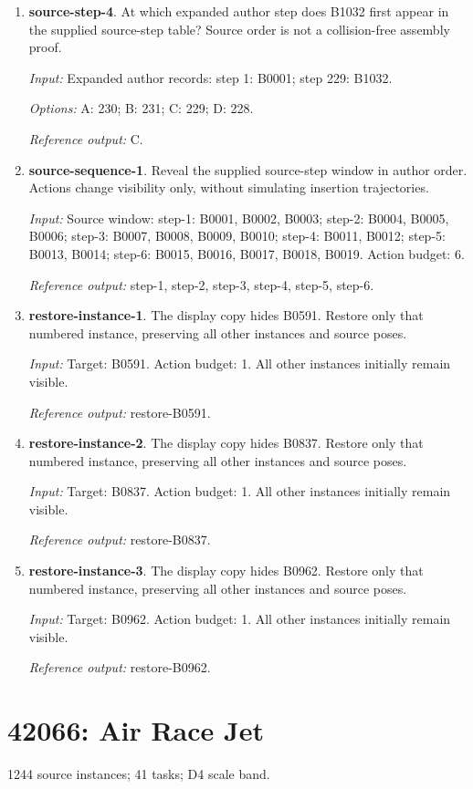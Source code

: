 \begin{enumerate}
\item \textbf{source-step-4}. At which expanded author step does B1032 first appear in the supplied source-step table? Source order is not a collision-free assembly proof.\par {\small \textit{Input:} Expanded author records: step 1: B0001; step 229: B1032. \par\textit{Options:} A: 230; B: 231; C: 229; D: 228. \par\textit{Reference output:} C.}
\item \textbf{source-sequence-1}. Reveal the supplied source-step window in author order. Actions change visibility only, without simulating insertion trajectories.\par {\small \textit{Input:} Source window: step-1: B0001, B0002, B0003; step-2: B0004, B0005, B0006; step-3: B0007, B0008, B0009, B0010; step-4: B0011, B0012; step-5: B0013, B0014; step-6: B0015, B0016, B0017, B0018, B0019. Action budget: 6. \par\textit{Reference output:} step-1, step-2, step-3, step-4, step-5, step-6.}
\item \textbf{restore-instance-1}. The display copy hides B0591. Restore only that numbered instance, preserving all other instances and source poses.\par {\small \textit{Input:} Target: B0591. Action budget: 1. All other instances initially remain visible. \par\textit{Reference output:} restore-B0591.}
\item \textbf{restore-instance-2}. The display copy hides B0837. Restore only that numbered instance, preserving all other instances and source poses.\par {\small \textit{Input:} Target: B0837. Action budget: 1. All other instances initially remain visible. \par\textit{Reference output:} restore-B0837.}
\item \textbf{restore-instance-3}. The display copy hides B0962. Restore only that numbered instance, preserving all other instances and source poses.\par {\small \textit{Input:} Target: B0962. Action budget: 1. All other instances initially remain visible. \par\textit{Reference output:} restore-B0962.}
\end{enumerate}
\clearpage
\section{42066: Air Race Jet}
1244 source instances; 41 tasks; D4 scale band.

